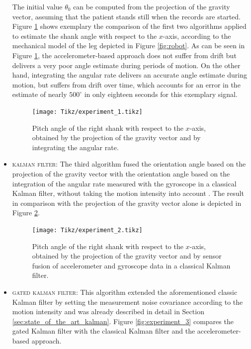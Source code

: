 \begin{itemize}
  \noindent The initial value $\theta_{0}$ can be computed from the projection of the gravity vector, assuming that the patient stands still when the records are started. Figure \ref{fig:experiment_1} shows exemplary the comparison of the first two algorithms applied to estimate the shank angle with respect to the $x$-axis, according to the mechanical model of the leg depicted in Figure \ref{fig:robot}. As can be seen in Figure \ref{fig:experiment_1}, the accelerometer-based approach does not suffer from drift but delivers a very poor angle estimate during periods of motion. On the other hand, integrating the angular rate delivers an accurate angle estimate during motion, but suffers from drift over time, which accounts for an error in the estimate of nearly $500^{\circ}$ in only eighteen seconds for this exemplary signal.
  
\begin{figure}
	\centering
	\newlength\figureheight 
	\newlength\figurewidth 
	\setlength\figureheight{7cm} 
	\setlength\figurewidth{\textwidth}
	\texttt{[image: Tikz/experiment\_1.tikz]}
	\caption{Pitch angle of the right shank with respect to the $x$-axis, obtained by the projection of the gravity vector and by integrating the angular rate.}
	\label{fig:experiment_1}
\end{figure}
  
  \item \textsc{kalman filter:} The third algorithm fused the orientation angle based on the projection of the gravity vector with the orientation angle based on the integration of the angular rate measured with the gyroscope in a classical Kalman filter, without taking the motion intensity into account \cite{olivares_vicente_gaitwatch_2013}. The result in comparison with the projection of the gravity vector alone is depicted in Figure \ref{fig:experiment_2}.

  \begin{figure}
	\centering
	\setlength\figureheight{7cm} 
	\setlength\figurewidth{\textwidth}
	\texttt{[image: Tikz/experiment\_2.tikz]}
	\caption{Pitch angle of the right shank with respect to the $x$-axis, obtained by the projection of the gravity vector and by sensor fusion of accelerometer and gyroscope data in a classical Kalman filter.}
	\label{fig:experiment_2}
\end{figure}
  
  \item \textsc{gated kalman filter:} This algorithm extended the aforementioned classic Kalman filter by setting the measurement noise covariance according to the motion intensity \cite{olivares_vicente_gaitwatch_2013} and was already described in detail in Section \ref{sec:state_of_the_art_kalman}. Figure \ref{fig:experiment_3} compares the gated Kalman filter with the classical Kalman filter and the accelerometer-based approach.
  \end{itemize}
  
